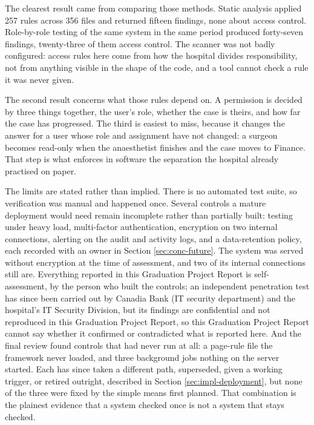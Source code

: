 The clearest result came from comparing those methods. Static analysis applied 257 rules across 356 files and returned fifteen findings, none about access control. Role-by-role testing of the same system in the same period produced forty-seven findings, twenty-three of them access control. The scanner was not badly configured: access rules here come from how the hospital divides responsibility, not from anything visible in the shape of the code, and a tool cannot check a rule it was never given.

The second result concerns what those rules depend on. A permission is decided by three things together, the user's role, whether the case is theirs, and how far the case has progressed. The third is easiest to miss, because it changes the answer for a user whose role and assignment have not changed: a surgeon becomes read-only when the anaesthetist finishes and the case moves to Finance. That step is what enforces in software the separation the hospital already practised on paper.

The limits are stated rather than implied. There is no automated test suite, so verification was manual and happened once. Several controls a mature deployment would need remain incomplete rather than partially built: testing under heavy load, multi-factor authentication, encryption on two internal connections, alerting on the audit and activity logs, and a data-retention policy, each recorded with an owner in Section \ref{sec:conc-future}. The system was served without encryption at the time of assessment, and two of its internal connections still are. Everything reported in this Graduation Project Report is self-assessment, by the person who built the controls; an independent penetration test has since been carried out by Canadia Bank (IT security department) and the hospital's IT Security Division, but its findings are confidential and not reproduced in this Graduation Project Report, so this Graduation Project Report cannot say whether it confirmed or contradicted what is reported here. And the final review found controls that had never run at all: a page-rule file the framework never loaded, and three background jobs nothing on the server started. Each has since taken a different path, superseded, given a working trigger, or retired outright, described in Section \ref{sec:impl-deployment}, but none of the three were fixed by the simple means first planned. That combination is the plainest evidence that a system checked once is not a system that stays checked.

